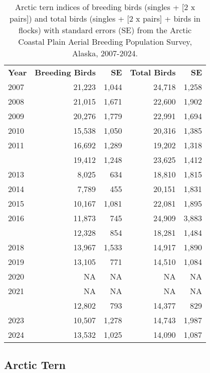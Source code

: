 \documentclass[
]{article}
\begin{document}
\begin{longtable}[t]{lrrrr}

\caption{\label{tbl-ARTE}Arctic tern indices of breeding birds (singles
+ {[}2 x pairs{]}) and total birds (singles + {[}2 x pairs{]} + birds in
flocks) with standard errors (SE) from the Arctic Coastal Plain Aerial
Breeding Population Survey, Alaska, 2007-2024.}

\tabularnewline

\\
\toprule
\textbf{Year} & \textbf{Breeding Birds} & \textbf{SE} & \textbf{Total Birds} & \textbf{SE}\\
\midrule
2007 & 21,223 & 1,044 & 24,718 & 1,258\\
2008 & 21,015 & 1,671 & 22,600 & 1,902\\
2009 & 20,276 & 1,779 & 22,991 & 1,694\\
2010 & 15,538 & 1,050 & 20,316 & 1,385\\
2011 & 16,692 & 1,289 & 19,202 & 1,318\\
\addlinespace
2012 & 19,412 & 1,248 & 23,625 & 1,412\\
2013 & 8,025 & 634 & 18,810 & 1,815\\
2014 & 7,789 & 455 & 20,151 & 1,831\\
2015 & 10,167 & 1,081 & 22,081 & 1,895\\
2016 & 11,873 & 745 & 24,909 & 3,883\\
\addlinespace
2017 & 12,328 & 854 & 18,281 & 1,484\\
2018 & 13,967 & 1,533 & 14,917 & 1,890\\
2019 & 13,105 & 771 & 14,510 & 1,084\\
2020 & NA & NA & NA & NA\\
2021 & NA & NA & NA & NA\\
\addlinespace
2022 & 12,802 & 793 & 14,377 & 829\\
2023 & 10,507 & 1,278 & 14,743 & 1,987\\
2024 & 13,532 & 1,025 & 14,090 & 1,087\\
\bottomrule

\end{longtable}

\endgroup{}

\newpage{}

\subsection*{Arctic Tern}\label{arctic-tern-2}
\end{document}
